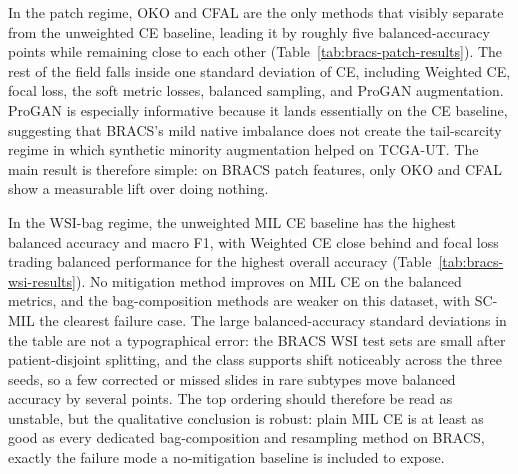 \documentclass[11pt]{article}
\begin{document}
\begin{table}[ht]
  \centering
  \caption{BRACS native WSI-bag test results for validation-selected configurations, mean $\pm$ standard deviation across patient-disjoint seeds.}
  \label{tab:bracs-wsi-results}
\end{table}

In the patch regime, OKO and CFAL are the only methods that visibly separate from the unweighted CE baseline, leading it by roughly five balanced-accuracy points while remaining close to each other (Table~\ref{tab:bracs-patch-results}). The rest of the field falls inside one standard deviation of CE, including Weighted CE, focal loss, the soft metric losses, balanced sampling, and ProGAN augmentation. ProGAN is especially informative because it lands essentially on the CE baseline, suggesting that BRACS's mild native imbalance does not create the tail-scarcity regime in which synthetic minority augmentation helped on TCGA-UT. The main result is therefore simple: on BRACS patch features, only OKO and CFAL show a measurable lift over doing nothing.

In the WSI-bag regime, the unweighted MIL CE baseline has the highest balanced accuracy and macro F1, with Weighted CE close behind and focal loss trading balanced performance for the highest overall accuracy (Table~\ref{tab:bracs-wsi-results}). No mitigation method improves on MIL CE on the balanced metrics, and the bag-composition methods are weaker on this dataset, with SC-MIL the clearest failure case. The large balanced-accuracy standard deviations in the table are not a typographical error: the BRACS WSI test sets are small after patient-disjoint splitting, and the class supports shift noticeably across the three seeds, so a few corrected or missed slides in rare subtypes move balanced accuracy by several points. The top ordering should therefore be read as unstable, but the qualitative conclusion is robust: plain MIL CE is at least as good as every dedicated bag-composition and resampling method on BRACS, exactly the failure mode a no-mitigation baseline is included to expose.
\end{document}
